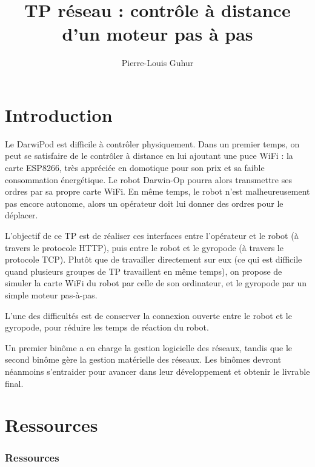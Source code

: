 \documentclass[abstracton]{scrartcl}
\title{TP réseau : contrôle à distance d'un moteur pas à pas}
\author{Pierre-Louis Guhur}
\begin{document}
\maketitle

\begin{abstract}
\end{abstract}





\section{Introduction}

Le DarwiPod est difficile à contrôler physiquement. Dans un premier temps, on peut se satisfaire de le contrôler à distance en lui ajoutant une puce WiFi : la carte ESP8266, très appréciée en domotique pour son prix et sa faible consommation énergétique.
Le robot Darwin-Op pourra alors transmettre ses ordres par sa propre carte WiFi.
En même temps, le robot n'est malheureusement pas encore autonome, alors un opérateur doit lui donner des ordres pour le déplacer.

L'objectif de ce TP est de réaliser ces interfaces entre l'opérateur et le robot (à travers le protocole HTTP), puis entre le robot et le gyropode (à travers le protocole TCP).
Plutôt que de travailler directement sur eux (ce qui est difficile quand plusieurs groupes de TP travaillent en même temps), on propose de simuler la carte WiFi du robot par celle de son ordinateur, et le gyropode par un simple moteur pas-à-pas.

L'une des difficultés est de conserver la connexion ouverte entre le robot et le gyropode, pour réduire les temps de réaction du robot.

Un premier binôme a en charge la gestion logicielle des réseaux, tandis que le second binôme gère la gestion matérielle des réseaux.
Les binômes devront néanmoins s'entraider pour avancer dans leur développement et obtenir le livrable final.


\section{Ressources}

\subsubsection{Ressources}
\end{document}
